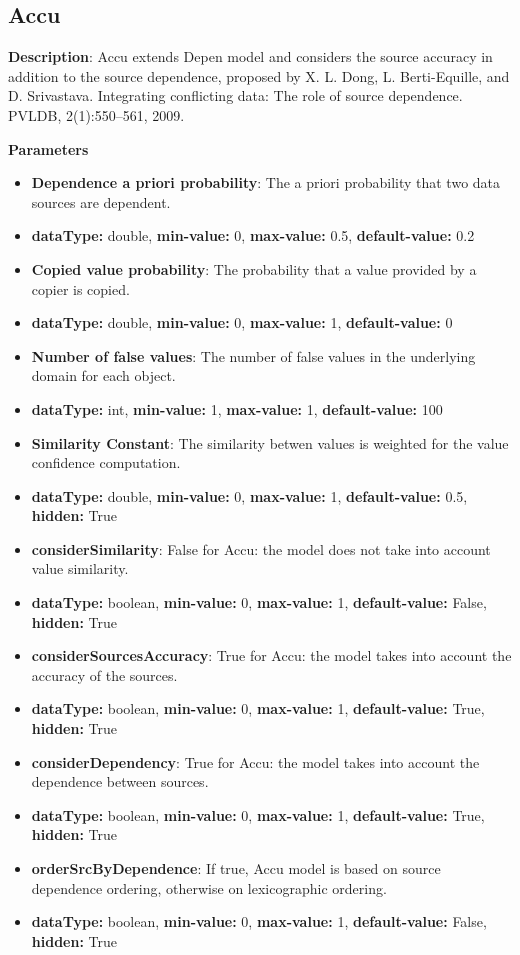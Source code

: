 \documentclass[a4paper,10pt]{scrartcl}
\begin{document}
\subsection{Accu}
\begin{description}
\item \textbf{Description}: Accu extends Depen model and considers the source accuracy in addition to the source dependence, proposed by X. L. Dong, L. Berti-Equille, and D. Srivastava. Integrating conflicting data: The role of source dependence. PVLDB, 2(1):550–561, 2009.
\item \textbf{Parameters}
\begin{itemize}
\item \textbf{Dependence a priori probability}: The a priori probability that two data sources are dependent.
\item[]\textbf{dataType: }double, \textbf{min-value: }0, \textbf{max-value: }0.5, \textbf{default-value: }0.2\item \textbf{Copied value probability}: The probability that a value provided by a copier is copied.
\item[]\textbf{dataType: }double, \textbf{min-value: }0, \textbf{max-value: }1, \textbf{default-value: }0\item \textbf{Number of false values}: The number of false values in the underlying domain for each object.
\item[]\textbf{dataType: }int, \textbf{min-value: }1, \textbf{max-value: }1, \textbf{default-value: }100\item \textbf{Similarity Constant}: The similarity betwen values is weighted for the value confidence computation.
\item[]\textbf{dataType: }double, \textbf{min-value: }0, \textbf{max-value: }1, \textbf{default-value: }0.5, \textbf{hidden: }True
\item \textbf{considerSimilarity}: False for Accu: the model does not take into account value similarity.
\item[]\textbf{dataType: }boolean, \textbf{min-value: }0, \textbf{max-value: }1, \textbf{default-value: }False, \textbf{hidden: }True
\item \textbf{considerSourcesAccuracy}: True for Accu: the model takes into account the accuracy of the sources.
\item[]\textbf{dataType: }boolean, \textbf{min-value: }0, \textbf{max-value: }1, \textbf{default-value: }True, \textbf{hidden: }True
\item \textbf{considerDependency}: True for Accu: the model takes into account the dependence between sources.
\item[]\textbf{dataType: }boolean, \textbf{min-value: }0, \textbf{max-value: }1, \textbf{default-value: }True, \textbf{hidden: }True
\item \textbf{orderSrcByDependence}: If true, Accu model is based on source dependence ordering, otherwise on lexicographic ordering.
\item[]\textbf{dataType: }boolean, \textbf{min-value: }0, \textbf{max-value: }1, \textbf{default-value: }False, \textbf{hidden: }True
\end{itemize}
\end{description}
\end{document}
